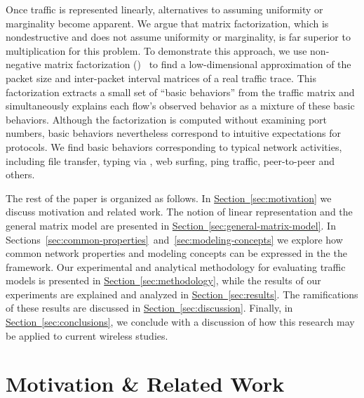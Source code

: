 \documentclass[twocolumn,final]{svjour3}
\newcommand{\caps}[1]{{\smaller{#1}}}
\newcommand{\Section}[1]{\hyperref[sec:#1]{Section~\ref*{sec:#1}}}
\newcommand{\newfootnote}[2]{\newcommand{#1}{\footnote{#2} }}
\begin{document}


Once traffic is represented linearly, alternatives to assuming uniformity or marginality become apparent.
We argue that matrix factorization, which is nondestructive and does not assume uniformity or marginality, is far superior to multiplication for this problem.
To demonstrate this approach, we use non-negative matrix factorization (\caps{NMF})~\cite{Lee01} to find a low-dimensional approximation of the packet size and inter-packet interval matrices of a real traffic trace.
This factorization extracts a small set of ``basic behaviors'' from the traffic matrix and simultaneously explains each flow's observed behavior as a mixture of these basic behaviors.
Although the factorization is computed without examining port numbers, basic behaviors nevertheless correspond to intuitive expectations for protocols.
We find basic behaviors corresponding to typical network activities, including file transfer, typing via \caps{SSH}, web surfing, ping traffic, peer-to-peer and others.


The rest of the paper is organized as follows. In \Section{motivation} we discuss motivation and related work. The notion of linear representation and the general matrix model are presented in \Section{general-matrix-model}. In Sections~\ref{sec:common-properties}~and~\ref{sec:modeling-concepts} we explore how common network properties and modeling concepts can be expressed in the the \caps{GMM} framework. Our experimental and analytical methodology for evaluating traffic models is presented in \Section{methodology}, while the results of our experiments are explained and analyzed in \Section{results}. The ramifications of these results are discussed in \Section{discussion}. Finally, in \Section{conclusions}, we conclude with a discussion of how this research may be applied to current wireless studies.

\section{Motivation \& Related Work}
\label{sec:related-work}
\label{sec:motivation}

\newfootnote{\QoSnote}{This is violated by some quality of service (QoS) schemes. However, we can simply add QoS metadata---such as traffic classes or urgency flags---to our models of user behavior and the rest of our arguments remain valid. The network is still disinterested in the exact content of the data being transported; only the QoS metadata is relevant.}
\end{document}
